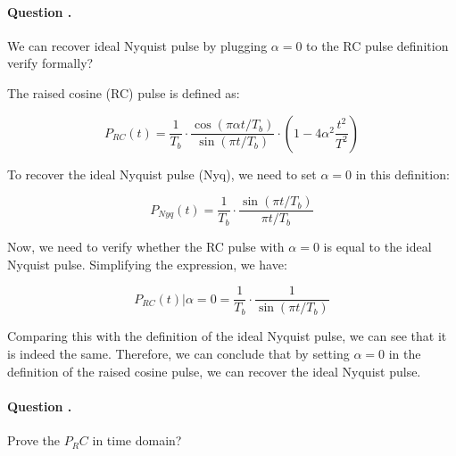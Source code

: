 \documentclass[14pt,a4paper]{report}
\newcounter{question}
\newcommand*\question{%
\stepcounter{question}%
\paragraph{Question \thesection.\thequestion}}
\begin{document}
\question
{
    We can recover ideal Nyquist pulse by plugging $\alpha  = 0$ to the RC pulse definition verify formally?
}
\begin{answer_box*}

    The raised cosine (RC) pulse is defined as:

    \begin{equation}
        P_{RC}(t) = \frac{1}{T_{b}} \cdot \frac{\cos\left(\pi\alpha t/T_{b}\right)}{\sin\left(\pi t/T_{b}\right)} \cdot \left(1-4\alpha^{2} \frac{t^{2}}{T^{2}}\right)
    \end{equation}

    To recover the ideal Nyquist pulse (Nyq), we need to set $\alpha = 0$ in this definition:

    \begin{equation}
        P_{Nyq}(t) = \frac{1}{T_{b}} \cdot \frac{\sin\left(\pi t/T_{b}\right)}{\pi t/T_{b}}
    \end{equation}

    Now, we need to verify whether the RC pulse with $\alpha = 0$ is equal to the ideal Nyquist pulse. Simplifying the expression, we have:

    \begin{equation}
        P_{RC}(t) \vert \alpha =0 = \frac{1}{T_{b}} \cdot \frac{1}{\sin\left(\pi t/T_{b}\right)}
    \end{equation}

    Comparing this with the definition of the ideal Nyquist pulse, we can see that it is indeed the same. Therefore, we can conclude that by setting $\alpha = 0$ in the definition of the raised cosine pulse, we can recover the ideal Nyquist pulse.
\end{answer_box*}

\question
{
    Prove the $P_RC$ in time domain?
}
\begin{answer_box*}
\end{answer_box*}
\end{document}
